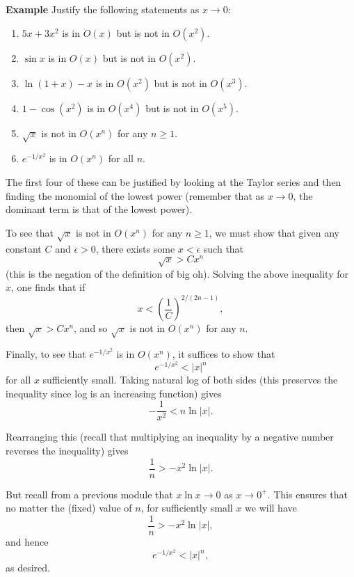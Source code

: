 \documentclass[twoside,openright,titlepage,a4paper]{book}
\begin{document}
\begin{sloppypar}
\textbf{Example} Justify the following statements as $x \rightarrow 0$:
\begin{enumerate}
	\item $5x+3x^2$ is in $O(x)$ but is not in $O(x^2)$.
	\item $\sin x$ is in $O(x)$ but is not in $O(x^2)$.
	\item $\ln(1+x)-x$ is in $O(x^2)$ but is not in $O(x^3)$.
	\item $1 - \cos(x^2)$ is in $O(x^4)$ but is not in $O(x^5)$.
	\item $\sqrt{x}$ is not in $O(x^n)$ for any $n \geq 1$.
	\item $e^{-1/x^2}$ is in $O(x^n)$ for all $n$.
\end{enumerate}
\begin{examplebox}
The first four of these can be justified by looking at the Taylor series and then finding the monomial of the lowest power (remember that as $x \rightarrow 0$, the dominant term is that of the lowest power).

To see that $\sqrt{x}$ is not in $O(x^n)$ for any $n \geq 1$, we must show that given any constant $C$ and $\epsilon>0$, there exists some $x < \epsilon$ such that \[ \sqrt{x} > C x^n \] (this is the negation of the definition of big oh). Solving the above inequality for $x$, one finds that if \[ x < \left(\frac{1}{C}\right)^{2/(2n-1)}, \] then $\sqrt{x} > C x^n$, and so $\sqrt{x}$ is not in $O(x^n)$ for any $n$.

Finally, to see that $e^{-1/x^2}$ is in $O(x^n)$, it suffices to show that \[ e^{-1/x^2} < |x|^n \] for all $x$ sufficiently small. Taking natural log of both sides (this preserves the inequality since log is an increasing function) gives \[ -\frac{1}{x^2} < n \ln|x|. \]

Rearranging this (recall that multiplying an inequality by a negative number reverses the inequality) gives \[ \frac{1}{n} > -x^2 \ln |x|. \]

But recall from a previous module that $ x \ln x \rightarrow 0$ as $x \rightarrow 0^+$. This ensures that no matter the (fixed) value of $n$, for sufficiently small $x$ we will have \[ \frac{1}{n} > -x^2 \ln |x|, \] and hence \[ e^{-1/x^2} < |x|^n, \] as desired.
\end{examplebox}


\end{sloppypar}
\end{document}
